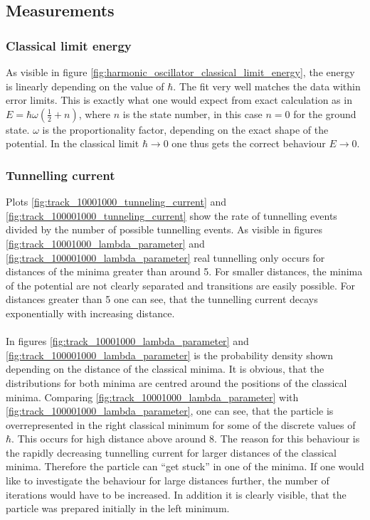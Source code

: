 \documentclass{scrartcl}
\begin{document}
	\subsection{Measurements}
	\subsubsection{Classical limit energy}
		As visible in figure \ref{fig:harmonic_oscillator_classical_limit_energy}, the energy is linearly depending on the value of $\hbar$.
		The fit very well matches the data within error limits.
		This is exactly what one would expect from exact calculation as in $E = \hbar \omega \left(\frac 12 + n\right)$, where $n$ is the state number, in this case $n = 0$ for the ground state.
		$\omega$ is the proportionality factor, depending on the exact shape of the potential.
		In the classical limit $\hbar \rightarrow 0$ one thus gets the correct behaviour $E \rightarrow 0$.

	\subsubsection{Tunnelling current}
		Plots \ref{fig:track_10001000_tunneling_current} and \ref{fig:track_100001000_tunneling_current} show the rate of tunnelling events divided by the number of possible tunnelling events. %
		As visible in figures \ref{fig:track_10001000_lambda_parameter} and \ref{fig:track_100001000_lambda_parameter} real tunnelling only occurs for distances of the minima greater than around 5.
		For smaller distances, the minima of the potential are not clearly separated and transitions are easily possible. %
		For distances greater than 5 one can see, that the tunnelling current decays exponentially with increasing distance.
		\\
		\\
		In figures \ref{fig:track_10001000_lambda_parameter} and \ref{fig:track_100001000_lambda_parameter} is the probability density shown depending on the distance of the classical minima.
		It is obvious, that the distributions for both minima are centred around the positions of the classical minima.
		Comparing \ref{fig:track_10001000_lambda_parameter} with \ref{fig:track_100001000_lambda_parameter}, one can see, that the particle is overrepresented in the right classical minimum for some of the discrete values of $\hbar$.
		This occurs for high distance above around 8.
		The reason for this behaviour is the rapidly decreasing tunnelling current for larger distances of the classical minima.
		Therefore the particle can \enquote{get stuck} in one of the minima.
		If one would like to investigate the behaviour for large distances further, the number of iterations would have to be increased.
		In addition it is clearly visible, that the particle was prepared initially in the left minimum.
\end{document}
